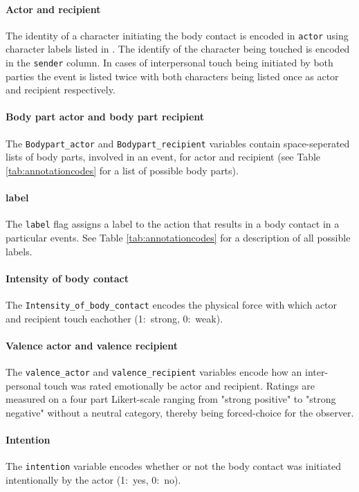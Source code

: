 \documentclass[10pt,a4paper,twocolumn]{article}
\begin{document}
\paragraph{Actor and recipient} The identity of a character initiating the body 
contact is encoded in \texttt{actor} using character labels listed in \citep{LRS+2015}.
The identify of the character being touched is encoded in the \texttt{sender} column.
In cases of interpersonal touch being initiated by both parties the event is listed twice with both characters being listed once as actor and recipient respectively.

\paragraph{Body part actor and body part recipient}

The \texttt{Bodypart_actor} and \texttt{Bodypart_recipient} variables contain space-seperated lists of body parts, involved in an event, for actor and recipient (see Table
\ref{tab:annotationcodes} for a list of possible body parts). 


\paragraph{label} The \texttt{label} flag assigns a label to the action that results in a body contact in a particular events. See Table
\ref{tab:annotationcodes} for a description of all possible labels.

\paragraph{Intensity of body contact} The \texttt{Intensity_of_body_contact} encodes the physical force with which actor and recipient touch eachother (1:~strong,
0:~weak).

\paragraph{Valence actor and valence recipient}
The \texttt{valence_actor} and \texttt{valence_recipient} variables encode how an inter-personal touch was rated emotionally be actor and recipient.
Ratings are measured on a four part Likert-scale ranging from "strong positive" to "strong negative" without a neutral category, thereby being forced-choice for the observer.

\paragraph{Intention} The \texttt{intention} variable encodes whether or not the body contact was initiated intentionally by the actor (1:~yes,
0:~no).
\end{document}
